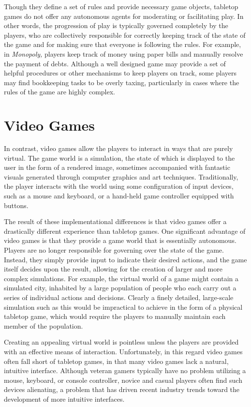 \documentclass{thesis}
\begin{document}
Though they define a set of rules and provide necessary game objects, tabletop games do not offer any autonomous agents for moderating or facilitating play. In other words, the progression of play is typically governed completely by the players, who are collectively responsible for correctly keeping track of the state of the game and for making sure that everyone is following the rules. For example, in \emph{Monopoly,} players keep track of money using paper bills and manually resolve the payment of debts. Although a well designed game may provide a set of helpful procedures or other mechanisms to keep players on track, some players may find bookkeeping tasks to be overly taxing, particularly in cases where the rules of the game are highly complex.

\section{Video Games}

In contrast, video games allow the players to interact in ways that are purely virtual. The game world is a simulation, the state of which is displayed to the user in the form of a rendered image, sometimes accompanied with fantastic visuals generated through computer graphics and art techniques. Traditionally, the player interacts with the world using some configuration of input devices, such as a mouse and keyboard, or a hand-held game controller equipped with buttons. 

The result of these implementational differences is that video games offer a drastically different experience than tabletop games. One significant advantage of video games is that they provide a game world that is essentially autonomous. Players are no longer responsible for governing over the state of the game. Instead, they simply provide input to indicate their desired actions, and the game itself decides upon the result, allowing for the creation of larger and more complex simulations. For example, the virtual world of a game might contain a simulated city, inhabited by a large population of people who each carry out a series of individual actions and decisions. Clearly a finely detailed, large-scale simulation such as this would be impractical to achieve in the form of a physical tabletop game, which would require the players to manually maintain each member of the population.

Creating an appealing virtual world is pointless unless the players are provided with an effective means of interaction. Unfortunately, in this regard video games often fall short of tabletop games, in that many video games lack a natural, intuitive interface. Although veteran gamers typically have no problem utilizing a mouse, keyboard, or console controller, novice and casual players often find such devices alienating, a problem that has driven recent industry trends toward the development of more intuitive interfaces.
\end{document}

